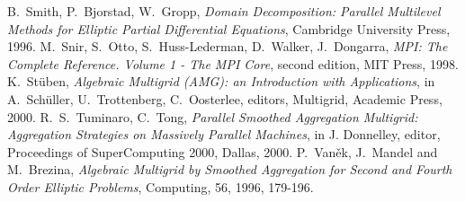\begin{thebibliography}{99}
B.~Smith, P.~Bjorstad, W.~Gropp,
{\em Domain Decomposition: Parallel Multilevel Methods for Elliptic
Partial Differential Equations},
Cambridge University Press, 1996.
%
M.~Snir, S.~Otto, S.~Huss-Lederman, D.~Walker, J.~Dongarra,
{\em MPI: The Complete Reference. Volume 1 - The MPI Core}, second edition,
MIT Press, 1998.
K.~St\"{u}ben,
{\em Algebraic Multigrid (AMG): an Introduction with Applications},
in A.~Sch\"{u}ller, U.~Trottenberg, C.~Oosterlee, editors, Multigrid,
Academic Press, 2000.
%
R.~S.~Tuminaro, C.~Tong,
{\em Parallel Smoothed Aggregation Multigrid: Aggregation Strategies on Massively Parallel Machines},
in J. Donnelley, editor, Proceedings of SuperComputing 2000, Dallas, 2000.
%
P.~Van{\v e}k, J.~Mandel and M.~Brezina,
{\em Algebraic Multigrid by Smoothed Aggregation for Second and Fourth Order Elliptic Problems},
Computing, 56, 1996, 179-196.
%

\end{thebibliography}
